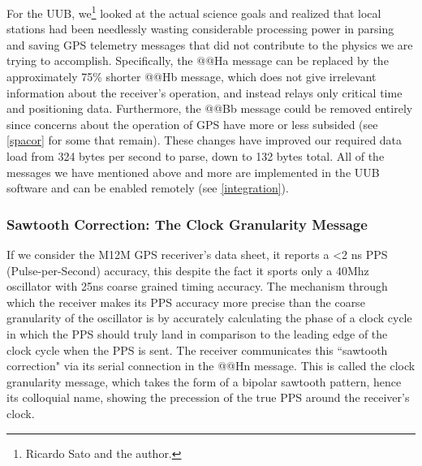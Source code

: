 For the UUB, we\footnote{Ricardo Sato and the author.} looked at the actual science goals and realized that local stations had been needlessly wasting considerable processing power in parsing and saving GPS telemetry messages that did not contribute to the physics we are trying to accomplish. Specifically, the @@Ha message can be replaced by the approximately 75\% shorter @@Hb message, which does not give irrelevant information about the receiver's operation, and instead relays only critical time and positioning data. Furthermore, the @@Bb message could be removed entirely since concerns about the operation of GPS have more or less subsided (see \autoref{spacor} for some that remain). These changes have improved our required data load from 324 bytes per second to parse, down to 132 bytes total. All of the messages we have mentioned above and more are implemented in the UUB software and can be enabled remotely (see \autoref{integration}). 

\subsubsection{Sawtooth Correction: The Clock Granularity Message}
\label{sawtooth}

If we consider the M12M GPS receriver's data sheet, it reports a \textless2 ns PPS (Pulse-per-Second) accuracy, this despite the fact it sports only a 40Mhz oscillator with 25ns coarse grained timing accuracy. The mechanism through which the receiver makes its PPS accuracy more precise than the coarse granularity of the oscillator is by accurately calculating the phase of a clock cycle in which the PPS should truly land in comparison to the leading edge of the clock cycle when the PPS is sent. The receiver communicates this ``sawtooth correction" via its serial connection in the @@Hn message. This is called the clock granularity message, which takes the form of a bipolar sawtooth pattern, hence its colloquial name, showing the precession of the true PPS around the receiver's clock. 

